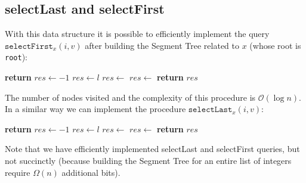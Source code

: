 \documentclass{article}
\begin{document}
\subsection{selectLast and selectFirst}
With this data structure it is possible to efficiently implement the query $\texttt{selectFirst}_x(i,v)$ after building the Segment Tree related to $x$ (whose root is \texttt{root}):
    \begin{algorithmic}[1]
        \State \textbf{return} 
    \EndProcedure
    \State
            \State $res\gets -1$
            \State $res\gets l$
        \Else
            \State $res\gets$
                \State $res\gets$
            \EndIf
        \EndIf
        \State \textbf{return} $res$
    \EndFunction
    \end{algorithmic}
The number of nodes visited and the complexity of this procedure is $\mathcal{O}(\log{n})$. In a similar way we can implement the procedure $\texttt{selectLast}_x(i,v)$:
    \begin{algorithmic}[1]
        \State \textbf{return} 
    \EndProcedure
    \State
            \State $\mathit{res}\gets -1$
            \State $\mathit{res}\gets l$
        \Else
            \State $\mathit{res}\gets$
                \State $\mathit{res}\gets$
            \EndIf
        \EndIf
        \State \textbf{return} $\mathit{res}$
    \EndFunction
    \end{algorithmic}    
Note that we have efficiently implemented selectLast and selectFirst queries, but not succinctly (because building the Segment Tree for an entire list of integers require $\Omega(n)$ additional bits).
\end{document}

